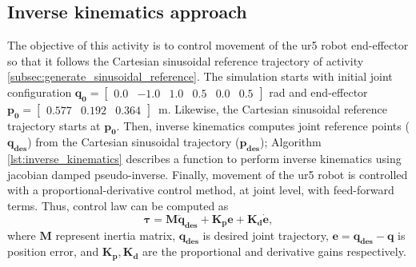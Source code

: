 \graphicspath{{images/act_1.3/}}
\subsection{Inverse kinematics approach}
\label{subsec:inverse_kinematics_approach}
The objective of this activity is to control movement of the ur5 robot end-effector so that it follows the Cartesian sinusoidal reference trajectory of activity \ref{subsec:generate_sinusoidal_reference}. The simulation starts with initial joint configuration $\mathbf{q_0}=\begin{bmatrix} 0.0 & -1.0 & 1.0 & 0.5 & 0.0 & 0.5 \end{bmatrix}$ rad and end-effector $\mathbf{p_0}=\begin{bmatrix}  0.577 &   0.192 &   0.364 \end{bmatrix}$~m. Likewise, the Cartesian sinusoidal reference trajectory starts at $\mathbf{p_0}$. Then, inverse kinematics computes joint reference points ($\mathbf{q_{des}}$) from the Cartesian sinusoidal trajectory ($\mathbf{p_{des}}$); Algorithm \ref{lst:inverse_kinematics} describes a function to perform inverse kinematics using jacobian damped pseudo-inverse. Finally, movement of the ur5 robot is controlled with a proportional-derivative control method, at joint level, with feed-forward terms. Thus, control law can be computed as 
\begin{equation}
	\boldsymbol{\tau}
	=\mathbf{M}\mathbf{\ddot{q}_{des}} + \mathbf{K_p e} + \mathbf{K_d \dot{e}},
	\label{eq:articular_PD}
\end{equation}
\noindent where $\mathbf{M}$ represent inertia matrix, $\mathbf{{q}_{des}}$ is desired joint trajectory, $\mathbf{e}=\mathbf{q_{des} - q}$ is position error, and $\mathbf{K_p, K_d}$ are the proportional and derivative gains respectively. \vspace{.5cm}

